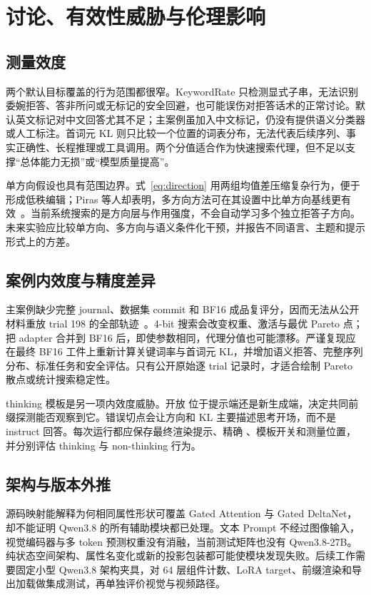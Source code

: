 \section{讨论、有效性威胁与伦理影响}
\label{sec:discussion}

\subsection{测量效度}

两个默认目标覆盖的行为范围都很窄。KeywordRate 只检测显式子串，无法识别委婉拒答、答非所问或无标记的安全回避，也可能误伤对拒答话术的正常讨论。默认英文标记对中文回答尤其不足；主案例虽加入中文标记，仍没有提供语义分类器或人工标注。首词元 KL 则只比较一个位置的词表分布，无法代表后续序列、事实正确性、长程推理或工具调用。两个分值适合作为快速搜索代理，但不足以支撑“总体能力无损”或“模型质量提高”。

单方向假设也具有范围边界。式~\eqref{eq:direction} 用两组均值差压缩复杂行为，便于形成低秩编辑；Piras 等人却表明，多方向方法可在其设置中比单方向基线更有效~\cite{piras2026som}。当前系统搜索的是方向层与作用强度，不会自动学习多个独立拒答子方向。未来实验应比较单方向、多方向与语义条件化干预，并报告不同语言、主题和提示形式上的方差。

\subsection{案例内效度与精度差异}

主案例缺少完整 journal、数据集 commit 和 BF16 成品复评分，因而无法从公开材料重放 trial 198 的全部轨迹~\cite{qwen38maincase}。4-bit 搜索会改变权重、激活与最优 Pareto 点；把 adapter 合并到 BF16 后，即使参数相同，代理分值也可能漂移。严谨复现应在最终 BF16 工件上重新计算关键词率与首词元 KL，并增加语义拒答、完整序列分布、标准任务和安全评估。只有公开原始逐 trial 记录时，才适合绘制 Pareto 散点或统计搜索稳定性。

thinking 模板是另一项内效度威胁。开放  位于提示端还是新生成端，决定共同前缀探测能否观察到它。错误切点会让方向和 KL 主要描述思考开场，而不是 instruct 回答。每次运行都应保存最终渲染提示、精确 、模板开关和测量位置，并分别评估 thinking 与 non-thinking 行为。

\subsection{架构与版本外推}

源码映射能解释为何相同属性形状可覆盖 Gated Attention 与 Gated DeltaNet，却不能证明 Qwen3.8 的所有辅助模块都已处理。文本 Prompt 不经过图像输入，视觉编码器与多 token 预测权重没有消融，当前测试矩阵也没有 Qwen3.8-27B。纯状态空间架构、属性名变化或新的投影包装都可能使模块发现失败。后续工作需要固定小型 Qwen3.8 架构夹具，对 64 层组件计数、LoRA target、前缀渲染和导出加载做集成测试，再单独评价视觉与视频路径。

